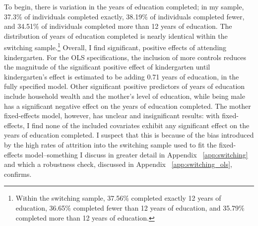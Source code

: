 To begin, there is variation in the years of education completed; in my sample, 37.3\% of individuals completed exactly, 38.19\% of individuals completed fewer, and 34.51\% of individuals completed more than 12 years of education. The distribution of years of education completed is nearly identical within the switching sample.\footnote{Within the switching sample, 37.56\% completed exactly 12 years of education, 36.65\% completed fewer than 12 years of education, and 35.79\% completed more than 12 years of education.} Overall, I find significant, positive effects of attending kindergarten. For the OLS specifications, the inclusion of more controls reduces the magnitude of the significant positive effect of kindergarten until kindergarten’s effect is estimated to be adding 0.71 years of education, in the fully specified model. Other significant positive predictors of years of education include household wealth and the mother's level of education, while being male has a significant negative effect on the years of education completed. The mother fixed-effects model, however, has unclear and insignificant results: with fixed-effects, I find none of the included covariates exhibit any significant effect on the years of education completed. I suspect that this is because of the bias introduced by the high rates of attrition into the switching sample used to fit the fixed-effects model--something I discuss in greater detail in Appendix ~\ref{app:switching} and which a robustness check, discussed in Appendix ~\ref{app:switching_ols}, confirms. 

